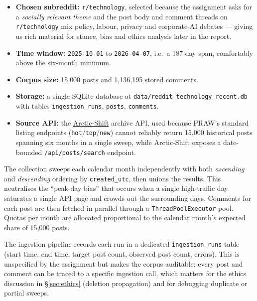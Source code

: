 \documentclass[11pt,a4paper]{article}
\newenvironment{extrabox}{%
  \par\medskip\noindent
  \def\FrameCommand{\fboxsep=6pt\fboxrule=0.6pt%
    \fcolorbox{extraboxrule}{extraboxbg}}%
  \MakeFramed{\advance\hsize-2\fboxsep\FrameRestore}%
  \noindent{\sffamily\bfseries\color{extraboxrule}Extra step.}\quad\ignorespaces%
}{\endMakeFramed\par\medskip}
\newenvironment{designbox}{%
  \par\medskip\noindent
  \def\FrameCommand{\fboxsep=6pt\fboxrule=0.4pt%
    \fcolorbox{designboxrule}{designboxbg}}%
  \MakeFramed{\advance\hsize-2\fboxsep\FrameRestore}%
  \noindent{\sffamily\bfseries Design choice.}\quad\ignorespaces%
}{\endMakeFramed\par\medskip}
\begin{document}
\begin{itemize}
  \item \textbf{Chosen subreddit:} \texttt{r/technology}, selected because the assignment asks for
        a \emph{socially relevant theme} and the post body and comment threads on
        \texttt{r/technology} mix policy, labour, privacy and corporate-AI debates --- giving us
        rich material for stance, bias and ethics analysis later in the report.
  \item \textbf{Time window:} \texttt{2025-10-01} to \texttt{2026-04-07}, i.e.\ a 187-day span,
        comfortably above the six-month minimum.
  \item \textbf{Corpus size:} 15{,}000 posts and 1{,}136{,}195 stored comments.
  \item \textbf{Storage:} a single SQLite database at \texttt{data/reddit\_technology\_recent.db}
        with tables \texttt{ingestion\_runs}, \texttt{posts}, \texttt{comments}.
  \item \textbf{Source API:} the \href{https://arctic-shift.photon-reddit.com/}{Arctic-Shift} archive
        API, used because PRAW's standard listing endpoints (\texttt{hot}/\texttt{top}/\texttt{new})
        cannot reliably return 15{,}000 historical posts spanning six months in a single sweep, while
        Arctic-Shift exposes a date-bounded \texttt{/api/posts/search} endpoint.
\end{itemize}

\begin{designbox}
The collection sweeps each calendar month independently with both \emph{ascending} and
\emph{descending} ordering by \texttt{created\_utc}, then unions the results. This neutralises the
``peak-day bias'' that occurs when a single high-traffic day saturates a single API page and
crowds out the surrounding days. Comments for each post are then fetched in parallel through a
\texttt{ThreadPoolExecutor} pool. Quotas per month are allocated proportional to the calendar
month's expected share of 15{,}000 posts.
\end{designbox}

\begin{extrabox}
The ingestion pipeline records each run in a dedicated \texttt{ingestion\_runs} table (start time,
end time, target post count, observed post count, errors). This is unspecified by the assignment but
makes the corpus auditable: every post and comment can be traced to a specific ingestion call,
which matters for the ethics discussion in \S\ref{sec:ethics} (deletion propagation) and for
debugging duplicate or partial sweeps.
\end{extrabox}
\end{document}
